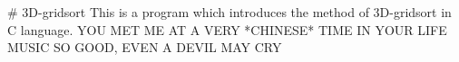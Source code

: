 # 3D-gridsort
This is a program which introduces the method of 3D-gridsort in C language.
YOU MET ME AT A VERY *CHINESE* TIME IN YOUR LIFE
MUSIC SO GOOD, EVEN A DEVIL MAY CRY
